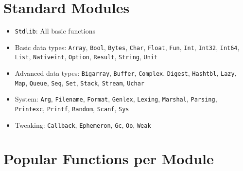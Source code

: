\documentclass[10pt,landscape]{article}
\begin{document}
\setlength{\premulticols}{1pt}
\setlength{\postmulticols}{1pt}
\setlength{\multicolsep}{1pt}
\setlength{\columnsep}{14pt}


\begin{multicols}{3}

\section{Standard Modules}

\begin{itemize}
\item \verb!Stdlib!: All basic functions
\item Basic data types:
 \verb!Array!, \verb!Bool!, \verb!Bytes!, \verb!Char!, \verb!Float!, \verb!Fun!,
 \verb!Int!, \verb!Int32!, \verb!Int64!, \verb!List!, \verb!Nativeint!,
 \verb!Option!, \verb!Result!, \verb!String!, \verb!Unit!
\item Advanced data types: \verb!Bigarray!, \verb!Buffer!, \verb!Complex!,
  \verb!Digest!, \verb!Hashtbl!, \verb!Lazy!, \verb!Map!, \verb!Queue!,
  \verb!Seq!, \verb!Set!, \verb!Stack!, \verb!Stream!, \verb!Uchar!

\item System: \verb!Arg!, \verb!Filename!, \verb!Format!, \verb!Genlex!,
  \verb!Lexing!, \verb!Marshal!, \verb!Parsing!, \verb!Printexc!, \verb!Printf!,
  \verb!Random!, \verb!Scanf!, \verb!Sys!
\item Tweaking: \verb!Callback!, \verb!Ephemeron!, \verb!Gc!, \verb!Oo!, \verb!Weak!
\end{itemize}

\section{Popular Functions per Module}


\end{multicols}
\end{document}
